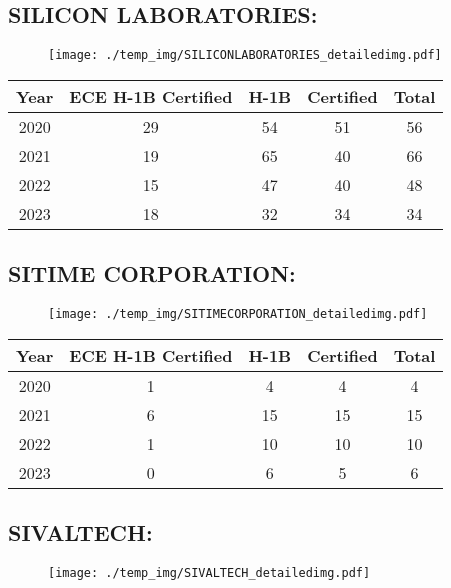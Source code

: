 \documentclass{article}%
\begin{document}
%
\newpage%
\subsection{SILICON LABORATORIES:}%
\label{subsec:SILICONLABORATORIES}%
\label{SILICONLABORATORIESdetailed}%


\begin{figure}[htbp]%
\centering%
\texttt{[image: ./temp\_img/SILICONLABORATORIES\_detailedimg.pdf]}%
\end{figure}

%
\begin{longtable}{c|c|c|c|c}%
\hline%
Year&ECE H{-}1B Certified&H{-}1B&Certified&Total\\%
\hline%
2020&29&54&51&56\\%
\hline%
2021&19&65&40&66\\%
\hline%
2022&15&47&40&48\\%
\hline%
2023&18&32&34&34\\%
\hline%
\end{longtable}

%
\newpage%
\subsection{SITIME CORPORATION:}%
\label{subsec:SITIMECORPORATION}%
\label{SITIMECORPORATIONdetailed}%


\begin{figure}[htbp]%
\centering%
\texttt{[image: ./temp\_img/SITIMECORPORATION\_detailedimg.pdf]}%
\end{figure}

%
\begin{longtable}{c|c|c|c|c}%
\hline%
Year&ECE H{-}1B Certified&H{-}1B&Certified&Total\\%
\hline%
2020&1&4&4&4\\%
\hline%
2021&6&15&15&15\\%
\hline%
2022&1&10&10&10\\%
\hline%
2023&0&6&5&6\\%
\hline%
\end{longtable}

%
\newpage%
\subsection{SIVALTECH:}%
\label{subsec:SIVALTECH}%
\label{SIVALTECHdetailed}%


\begin{figure}[htbp]%
\centering%
\texttt{[image: ./temp\_img/SIVALTECH\_detailedimg.pdf]}%
\end{figure}
\end{document}
